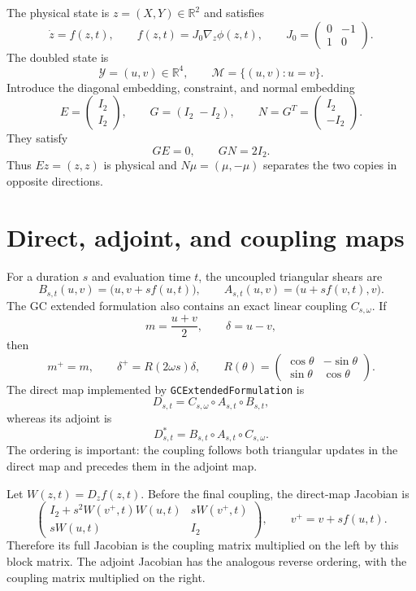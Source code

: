 \documentclass[11pt,a4paper]{article}
\newcommand{\R}{\mathbb{R}}
\newcommand{\Id}{I}
\newcommand{\Y}{\mathcal{Y}}
\newcommand{\M}{\mathcal{M}}
\begin{document}
The physical state is $z=(X,Y)\in\R^2$ and satisfies
\[
 \dot z=f(z,t),
 \qquad
 f(z,t)=J_0\nabla_z\phi(z,t),
 \qquad
 J_0=
 \begin{pmatrix}0&-1\\1&0\end{pmatrix}.
\]
The doubled state is
\[
 \Y=(u,v)\in\R^4,
 \qquad
 \M=\{(u,v):u=v\}.
\]
Introduce the diagonal embedding, constraint, and normal embedding
\[
 E=\begin{pmatrix}\Id_2\\\Id_2\end{pmatrix},
 \qquad
 G=(\Id_2\;-\Id_2),
 \qquad
 N=G^T=\begin{pmatrix}\Id_2\\-\Id_2\end{pmatrix}.
\]
They satisfy
\[
 GE=0,
 \qquad
 GN=2\Id_2.
\]
Thus $Ez=(z,z)$ is physical and $N\mu=(\mu,-\mu)$ separates the two
copies in opposite directions.

\section{Direct, adjoint, and coupling maps}

For a duration $s$ and evaluation time $t$, the uncoupled triangular shears are
\[
 B_{s,t}(u,v)=\bigl(u,v+s f(u,t)\bigr),
 \qquad
 A_{s,t}(u,v)=\bigl(u+s f(v,t),v\bigr).
\]
The GC extended formulation also contains an exact linear coupling
$C_{s,\omega}$.  If
\[
 m=\frac{u+v}{2},
 \qquad
 \delta=u-v,
\]
then
\[
 m^+=m,
 \qquad
 \delta^+=R(2\omega s)\delta,
 \qquad
 R(\theta)=
 \begin{pmatrix}
  \cos\theta&-\sin\theta\\
  \sin\theta&\cos\theta
 \end{pmatrix}.
\]
The direct map implemented by \texttt{GCExtendedFormulation} is
\[
 D_{s,t}=C_{s,\omega}\circ A_{s,t}\circ B_{s,t},
\]
whereas its adjoint is
\[
 D^*_{s,t}=B_{s,t}\circ A_{s,t}\circ C_{s,\omega}.
\]
The ordering is important: the coupling follows both triangular updates in the
direct map and precedes them in the adjoint map.

Let $W(z,t)=D_zf(z,t)$.  Before the final coupling, the direct-map Jacobian is
\[
 \begin{pmatrix}
  \Id_2+s^2W(v^+,t)W(u,t)&sW(v^+,t)\\
  sW(u,t)&\Id_2
 \end{pmatrix},
 \qquad
 v^+=v+s f(u,t).
\]
Therefore its full Jacobian is the coupling matrix multiplied on the left by
this block matrix.  The adjoint Jacobian has the analogous reverse ordering,
with the coupling matrix multiplied on the right.
\end{document}
